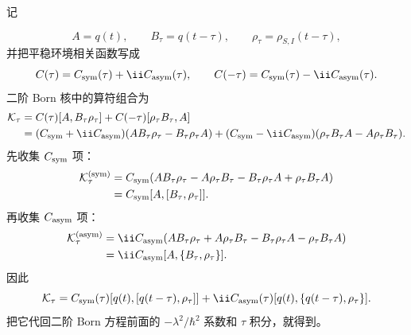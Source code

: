 \begin{derivation}[记忆核中的噪声与耗散]
记

\begin{equation*}
A=q(t),\qquad B_\tau=q(t-\tau),\qquad \rho_\tau=\rho_{S,I}(t-\tau),
\end{equation*}
并把平稳环境相关函数写成
\begin{equation*}
C(\tau)=C_{\rm sym}(\tau)+\ii C_{\rm asym}(\tau),\qquad
C(-\tau)=C_{\rm sym}(\tau)-\ii C_{\rm asym}(\tau).
\end{equation*}
二阶 Born 核中的算符组合为
\begin{align*}
\mathcal K_\tau
={}&C(\tau)[A,B_\tau\rho_\tau]
+C(-\tau)[\rho_\tau B_\tau,A]\\
={}&(C_{\rm sym}+\ii C_{\rm asym})(AB_\tau\rho_\tau-B_\tau\rho_\tau A)
+(C_{\rm sym}-\ii C_{\rm asym})(\rho_\tau B_\tau A-A\rho_\tau B_\tau).
\end{align*}
先收集 $C_{\rm sym}$ 项：
\begin{align*}
\mathcal K_\tau^{({\rm sym})}
&=C_{\rm sym}(AB_\tau\rho_\tau-A\rho_\tau B_\tau-B_\tau\rho_\tau A+\rho_\tau B_\tau A)\\
&=C_{\rm sym}[A,[B_\tau,\rho_\tau]].
\end{align*}
再收集 $C_{\rm asym}$ 项：
\begin{align*}
\mathcal K_\tau^{({\rm asym})}
&=\ii C_{\rm asym}(AB_\tau\rho_\tau+A\rho_\tau B_\tau-B_\tau\rho_\tau A-\rho_\tau B_\tau A)\\
&=\ii C_{\rm asym}[A,\{B_\tau,\rho_\tau\}].
\end{align*}
因此
\begin{equation*}
\mathcal K_\tau
=C_{\rm sym}(\tau)[q(t),[q(t-\tau),\rho_\tau]]
+\ii C_{\rm asym}(\tau)[q(t),\{q(t-\tau),\rho_\tau\}].
\end{equation*}
把它代回二阶 Born 方程前面的 $-\lambda^2/\hbar^2$ 系数和 $\tau$ 积分，就得到。
\end{derivation}

